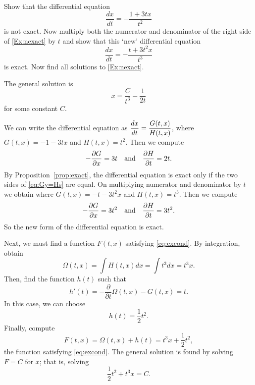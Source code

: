 \documentclass{ximera}
\begin{document}
\begin{exercise}  \label{ex:if}
Show that the differential equation
\begin{equation} \label{Ex:nexact}
\frac{dx}{dt} = -\frac{1+3tx}{t^2}
\end{equation}
is not exact.  Now multiply both the numerator and denominator of the 
right side of \eqref{Ex:nexact} by $t$ and show that this `new' differential
equation 
\[
\frac{dx}{dt} = -\frac{t+3t^2x}{t^3}
\]
is exact. Now find all solutions to \eqref{Ex:nexact}.

\begin{solution}
\ans The general solution is 
\[ x = \frac{C}{t^3} - \frac{1}{2t} \] 
for some constant $C$.

\soln We can write the differential equation as $\displaystyle\frac{dx}{dt} =
\frac{G(t,x)}{H(t,x)}$, where $G(t,x) = -1-3tx$ and $H(t,x) = t^2$. 
Then we compute
\[
-\frac{\partial G}{\partial x} = 3t \quad\mbox{and}\quad
\frac{\partial H}{\partial t} = 2t.
\]
By Proposition~\ref{prop:exact}, the
differential equation is exact only if the two sides of \eqref{eq:Gy=Hs} are
equal.
On multiplying numerator and denominator by $t$ we obtain
where $G(t,x) = -t-3t^2x$ and $H(t,x) = t^3$. 
Then we compute
\[
-\frac{\partial G}{\partial x} = 3t^2 \quad\mbox{and}\quad
\frac{\partial H}{\partial t} = 3t^2.
\]
So the new form of the differential equation is exact.

Next, we must find a function $F(t,x)$ satisfying \eqref{eq:excond}.
By integration, obtain
\[
\Omega(t,x) = \int H(t,x)dx = \int t^3dx = t^3x.
\]
Then, find the function $h(t)$ such that
\[
h'(t) = -\frac{\partial}{\partial t}\Omega(t,x) - G(t,x)
= t.
\]
In this case, we can choose 
\[
h(t) =  \frac{1}{2}t^2.  
\]
Finally, compute
\[
F(t,x) = \Omega(t,x) + h(t) = t^3x + \frac{1}{2}t^2,
\]
the function satisfying \eqref{eq:excond}.  The general solution is found by 
solving $F=C$ for $x$; that is, solving
\[
\frac{1}{2}t^2 + t^3x = C.
\]

\end{solution}
\end{exercise}
\end{document}
